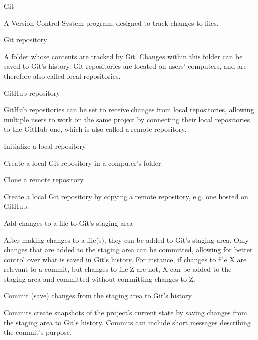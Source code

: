 \documentclass[
  american,
  ,doc,floatsintext]{apa6}
\begin{document}
\begin{tcolorbox}[colframe=green!50!black, colback=green!5, fonttitle=\small\bfseries, fontupper=\small, title=Box 2. Main Git operations and terms.]
Git
    \begin{compactitem}
    \item A Version Control System program, designed to track changes to files.
    \end{compactitem}
Git repository
    \begin{compactitem}
    \item A folder whose contents are tracked by Git. Changes within this folder can be saved to Git's history. Git repositories are located on users' computers, and are therefore also called local repositories.
    \end{compactitem}
GitHub repository
    \begin{compactitem}
    \item GitHub repositories can be set to receive changes from local repositories, allowing multiple users to work on the same project by connecting their local repositories to the GitHub one, which is also called a remote repository. 
    \end{compactitem}
Initialize a local repository
    \begin{compactitem}
    \item Create a local Git repository in a computer's folder. 
    \end{compactitem}
Clone a remote repository
    \begin{compactitem}
    \item Create a local Git repository by copying a remote repository, e.g. one hosted on GitHub.
    \end{compactitem}
Add changes to a file to Git's staging area
    \begin{compactitem}
    \item After making changes to a file(s), they can be added to Git's staging area. Only changes that are added to the staging area can be committed, allowing for better control over what is saved in Git's history. For instance, if changes to file X are relevant to a commit, but changes to file Z are not, X can be added to the staging area and committed without committing changes to Z.
    \end{compactitem}
Commit (save) changes from the staging area to Git's history
    \begin{compactitem}
    \item Commits create snapshots of the project's current state by saving changes from the staging area to Git's history. Commits can include short messages describing the commit's purpose.

\end{compactitem}
\end{tcolorbox}
\end{document}
